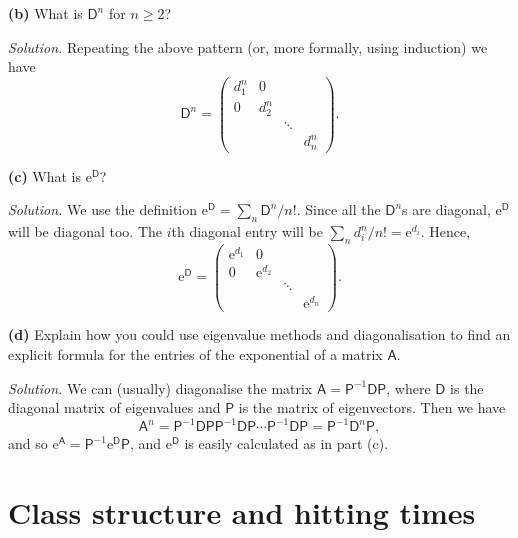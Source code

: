\documentclass[
  a4paper,
]{article}
\theoremstyle{definition}
\theoremstyle{definition}
\theoremstyle{definition}
\theoremstyle{remark}
\begin{document}
\textbf{(b)} What is \(\mathsf D^n\) for \(n \geq 2\)?

\begin{myanswers}
\emph{Solution.}
Repeating the above pattern (or, more formally, using induction) we have
\[ \mathsf D^n = \begin{pmatrix} d_1^n & 0 & &  \\
0 & d_2^n & &  \\
&  & \ddots & \\
&  & & d_n^n \end{pmatrix} .\]

\end{myanswers}

\textbf{(c)} What is \(\mathrm{e}^{\mathsf D}\)?

\begin{myanswers}
\emph{Solution.}
We use the definition \(\mathrm{e}^{\mathsf D} = \sum_n \mathsf D^n / n!\). Since all the \(\mathsf D^n\)s are diagonal, \(\mathrm{e}^{\mathsf D}\) will be diagonal too. The \(i\)th diagonal entry will be \(\sum_n d_i^n / n! = \mathrm{e}^{d_i}\). Hence,
\[ \mathrm{e}^{\mathsf D}  = \begin{pmatrix} \mathrm{e}^{d_1} & 0 & &  \\
0 & \mathrm{e}^{d_2} & &  \\
&  & \ddots & \\
&  & & \mathrm{e}^{d_n} \end{pmatrix} .\]

\end{myanswers}

\textbf{(d)} Explain how you could use eigenvalue methods and diagonalisation to find an explicit formula for the entries of the exponential of a matrix \(\mathsf A\).

\begin{myanswers}
\emph{Solution.}
We can (usually) diagonalise the matrix \(\mathsf A = \mathsf P^{-1}\mathsf{DP}\), where \(\mathsf D\) is the diagonal matrix of eigenvalues and \(\mathsf P\) is the matrix of eigenvectors. Then we have
\[ \mathsf A^n = \mathsf P^{-1}\mathsf{DP}\mathsf P^{-1}\mathsf{DP}\cdots\mathsf P^{-1}\mathsf{DP} = \mathsf P^{-1}\mathsf{D}^n\mathsf{P} ,  \]
and so \(\mathrm{e}^{\mathsf A} = \mathsf P^{-1} \mathrm{e}^{\mathsf D} \mathsf P\), and \(\mathrm{e}^{\mathsf D}\) is easily calculated as in part (c).

\end{myanswers}

\hypertarget{S19-class-hitting}{%
\section{Class structure and hitting times}\label{S19-class-hitting}}
\end{document}
